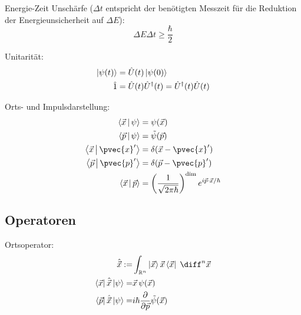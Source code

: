 \documentclass[11pt]{article}
\numberwithin{equation}{section}
\begin{document}
      Energie-Zeit Unschärfe ($\Delta t$ entspricht der benötigten Messzeit für die Reduktion der Energieunsicherheit auf $\Delta E$):
      \begin{equation}
        \Delta E \Delta t \ge \frac{\hbar}{2}
      \end{equation}

      Unitarität:
      \begin{equation}
        \begin{aligned}
          \Ket{\psi(t)} &= \hat{U}(t) \Ket{\psi(0)} \\
          \hat{1} &= \hat{U}(t)\hat{U}^\dagger(t) = \hat{U}^\dagger(t)\hat{U}(t) \\
        \end{aligned}
      \end{equation}

      Orts- und Impulsdarstellung:
      \begin{equation}
        \begin{aligned}
          \Braket{\vec{x} | \psi} &= \psi(\vec{x}) \\
          \Braket{\vec{p} | \psi} &= \tilde{\psi}(\vec{p}) \\
          \Braket{\vec{x} | \pvec{x}'} &= \delta(\vec{x} - \pvec{x}') \\
          \Braket{\vec{p} | \pvec{p}'} &= \delta(\vec{p} - \pvec{p}') \\
          \Braket{\vec{x} | \vec{p}} &= \left( \frac{1}{\sqrt{2\pi\hbar}} \right)^\mathrm{dim} e^{i \vec{p}\cdot\vec{x} / \hbar} \\
        \end{aligned}
      \end{equation}

    \subsection{Operatoren}
      Ortsoperator:
      \begin{equation}
        \begin{aligned}
          \hat{\vec{x}} :=& \int_{\mathbb{R}^n} \Ket{\vec{x}} \vec{x} \Bra{\vec{x}}\;\diff^n\vec{x} \\
          \Bra{\vec{x}}\hat{\vec{x}}\Ket{\psi} =& \vec{x}\, \psi(\vec{x}) \\
          \Bra{\vec{p}}\hat{\vec{x}}\Ket{\psi} =& i\hbar\pder{}{\vec{p}}\tilde{\psi}(\vec{x}) \\
        \end{aligned}
      \end{equation}
\end{document}
